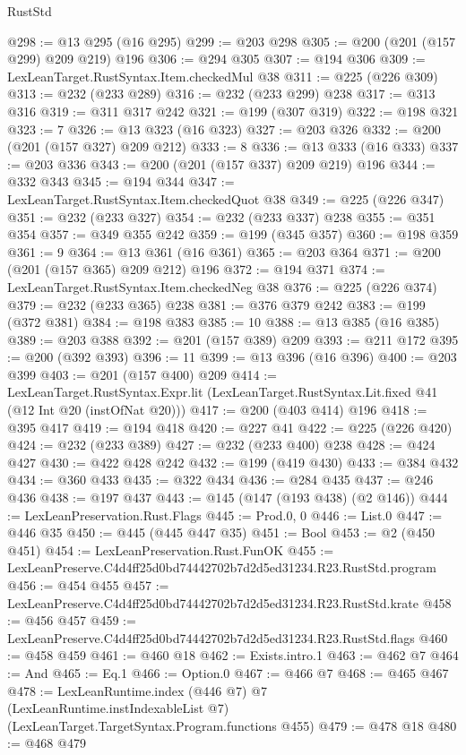 \begin{lexlean}{RustStd}
\begin{coremodule}
@298 := @13 @295 (@16 @295)
@299 := @203 @298
@305 := @200 (@201 (@157 @299) @209 @219) @196
@306 := @294 @305
@307 := @194 @306
@309 := LexLeanTarget.RustSyntax.Item.checkedMul @38
@311 := @225 (@226 @309)
@313 := @232 (@233 @289)
@316 := @232 (@233 @299) @238
@317 := @313 @316
@319 := @311 @317 @242
@321 := @199 (@307 @319)
@322 := @198 @321
@323 := 7
@326 := @13 @323 (@16 @323)
@327 := @203 @326
@332 := @200 (@201 (@157 @327) @209 @212)
@333 := 8
@336 := @13 @333 (@16 @333)
@337 := @203 @336
@343 := @200 (@201 (@157 @337) @209 @219) @196
@344 := @332 @343
@345 := @194 @344
@347 := LexLeanTarget.RustSyntax.Item.checkedQuot @38
@349 := @225 (@226 @347)
@351 := @232 (@233 @327)
@354 := @232 (@233 @337) @238
@355 := @351 @354
@357 := @349 @355 @242
@359 := @199 (@345 @357)
@360 := @198 @359
@361 := 9
@364 := @13 @361 (@16 @361)
@365 := @203 @364
@371 := @200 (@201 (@157 @365) @209 @212) @196
@372 := @194 @371
@374 := LexLeanTarget.RustSyntax.Item.checkedNeg @38
@376 := @225 (@226 @374)
@379 := @232 (@233 @365) @238
@381 := @376 @379 @242
@383 := @199 (@372 @381)
@384 := @198 @383
@385 := 10
@388 := @13 @385 (@16 @385)
@389 := @203 @388
@392 := @201 (@157 @389) @209
@393 := @211 @172
@395 := @200 (@392 @393)
@396 := 11
@399 := @13 @396 (@16 @396)
@400 := @203 @399
@403 := @201 (@157 @400) @209
@414 := LexLeanTarget.RustSyntax.Expr.lit
    (LexLeanTarget.RustSyntax.Lit.fixed @41 (@12 Int @20 (instOfNat @20)))
@417 := @200 (@403 @414) @196
@418 := @395 @417
@419 := @194 @418
@420 := @227 @41
@422 := @225 (@226 @420)
@424 := @232 (@233 @389)
@427 := @232 (@233 @400) @238
@428 := @424 @427
@430 := @422 @428 @242
@432 := @199 (@419 @430)
@433 := @384 @432
@434 := @360 @433
@435 := @322 @434
@436 := @284 @435
@437 := @246 @436
@438 := @197 @437
@443 := @145 (@147 (@193 @438) (@2 @146))
@444 := LexLeanPreservation.Rust.Flags
@445 := Prod.{0, 0}
@446 := List.{0}
@447 := @446 @35
@450 := @445 (@445 @447 @35)
@451 := Bool
@453 := @2 (@450 @451)
@454 := LexLeanPreservation.Rust.FunOK
@455 := LexLeanPreserve.C4d4ff25d0bd74442702b7d2d5ed31234.R23.RustStd.program
@456 := @454 @455
@457 := LexLeanPreserve.C4d4ff25d0bd74442702b7d2d5ed31234.R23.RustStd.krate
@458 := @456 @457
@459 := LexLeanPreserve.C4d4ff25d0bd74442702b7d2d5ed31234.R23.RustStd.flags
@460 := @458 @459
@461 := @460 @18
@462 := Exists.intro.{1}
@463 := @462 @7
@464 := And
@465 := Eq.{1}
@466 := Option.{0}
@467 := @466 @7
@468 := @465 @467
@478 := LexLeanRuntime.index
    (@446 @7)
    @7
    (LexLeanRuntime.instIndexableList @7)
    (LexLeanTarget.TargetSyntax.Program.functions @455)
@479 := @478 @18
@480 := @468 @479

\end{coremodule}
\end{lexlean}
